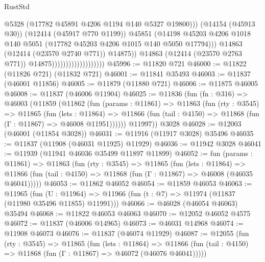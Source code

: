 \begin{lexlean}{RustStd}
\begin{coremodule}
                                                    @5328
                                                    (@17782 @45891 @4206 @1194 @140 @5327 @19800)))
                                                (@14154 (@45913 @30))
                                                (@12414 (@45917 @770 @1199))
                                                @45851
                                                (@14198
                                                  @45203
                                                  @4206
                                                  @1018
                                                  @140
                                                  @5051
                                                  (@17782 @45203 @4206 @1015 @140 @5050 @17794)))
                                              @14863
                                              (@12414 (@23570 @2740 @771))
                                              @14875))
                                          @14863
                                          (@12414 (@23570 @2763 @771))
                                          @14875)))))))))))))))))))
@45996 := @11820 @721
@46000 := @11822 (@11826 @721) (@11832 @721)
@46001 := @11841 @35493
@46003 := @11837 (@46001 @11856)
@46005 := @11879 (@11880 @721)
@46006 := @11875 @46005
@46008 := @11837 (@46006 @11904)
@46025 := @11836
    (fun (fn : @316) =>
    @46003
      (@11859
        (@11862
          (fun (params : @11861) =>
          @11863
            (fun (rty : @3545) =>
            @11865
              (fun (lets : @11864) =>
              @11866 (fun (tail : @4150) => @11868 (fun (Γ : @11867) => @46008 @11951))))))
        @11997))
    @3028
@46028 := @12003 (@46001 (@11854 @3028))
@46031 := @11916 (@11917 @3028) @35496
@46035 := @11837 (@11908 (@46031 @11925) @11929)
@46036 := @11942 @3028
@46041 := @11939 (@11941 @46036 @35499 @11897 @11899)
@46052 := fun (params : @11861) =>
  @11863
    (fun (rty : @3545) =>
    @11865
      (fun (lets : @11864) =>
      @11866 (fun (tail : @4150) => @11868 (fun (Γ : @11867) => @46008 (@46035 @46041)))))
@46053 := @11862 @46052
@46054 := @11859 @46053
@46063 := @11965
    (fun (U : @11964) => @11966 (fun (t : @7) => @11974 (@11837 (@11980 @35496 @11855) @11991)))
@46066 := @46028 (@46054 @46063) @35494
@46068 := @11822 @46053 @46063
@46070 := @12052 @46052 @4575
@46072 := @11837 (@46006 @14965)
@46073 := @46031 @14968
@46074 := @11908 @46073
@46076 := @11837 (@46074 @11929)
@46087 := @12055
    (fun (rty : @3545) =>
    @11865
      (fun (lets : @11864) =>
      @11866 (fun (tail : @4150) => @11868 (fun (Γ : @11867) => @46072 (@46076 @46041)))))

\end{coremodule}
\end{lexlean}
